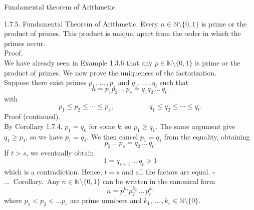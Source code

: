 \documentclass[smaller,hyperref={CJKbookmarks=true}]{beamer}
\newcommand{\N}{\mathbb{N}} \newcommand{\Z}{\mathbb{Z}} \newcommand{\Q}{\mathbb{Q}}
\newenvironment{PROOF}{{\noindent\!\sf\alert{Proof.}}\\}{\hfill$\square$\\}
\newcounter{zhuo}[subsection]
\renewcommand{\thezhuo}{\thesection.\thesubsection.\arabic{zhuo}}
\newenvironment{COROLLARY}{\stepcounter{zhuo}\alert{\thezhuo.~Corollary.\,}}{}
\begin{document}
\begin{frame}{Fundamental theorem of Arithmetic}
\begin{spacing}{1.05}
\alert{1.7.5. Fundamental Theorem of Arithmetic.} Every $n\in\N\setminus\{0,1\}$ is prime or the product of primes. This product is unique, apart from the order in which the primes occur.\\[6pt]
\begin{PROOF}
We have already seen in Example 1.3.6 that any $p\in\N\setminus\{0,1\}$ is prime or the product of primes. We now prove the uniqueness of the factorization.\\[4pt]
Suppose there exist primes $p_1,\,...\,,p_s$ and $q_1,\,...\,,q_t$ such that
\[n=p_1p_2\,...\,p_s=q_1q_2\,...\,q_t.\]
with
\[p_1\leq p_2\leq\cdots\leq p_s,\qquad\qquad\quad
q_1\leq q_2\leq\cdots\leq q_t.\]
\newpage
\alert{Proof (continued).}\\
By Corollary 1.7.4, $p_1=q_k$ for some $k$, so $p_1\geq q_1$. The same argument give $q_1\geq p_1$, so we have $p_1=q_1$. We then cancel $p_1=q_1$ from the equality, obtaining
\[p_2\,...\,p_s=q_2\,...\,q_t.\]
If $t>s$, we eventually obtain
\[1=q_{s+1}\,...\,q_t>1\]
which is a contradiction. Hence, $t=s$ and all the factors are equal.
\end{PROOF}
\vspace*{4pt}
\begin{COROLLARY}
Any $n\in\N\setminus\{0,1\}$ can be written in the canonical form
\[n=p_1^{k_1}p_2^{k_2}\,...\,p_r^{k_r}\]
where $p_1<p_2<...p_r$ are prime numbers and $k_1,\,...\,,k_r\in\N\setminus\{0\}$.
\end{COROLLARY}
\end{spacing}
\end{frame}
\end{document}
